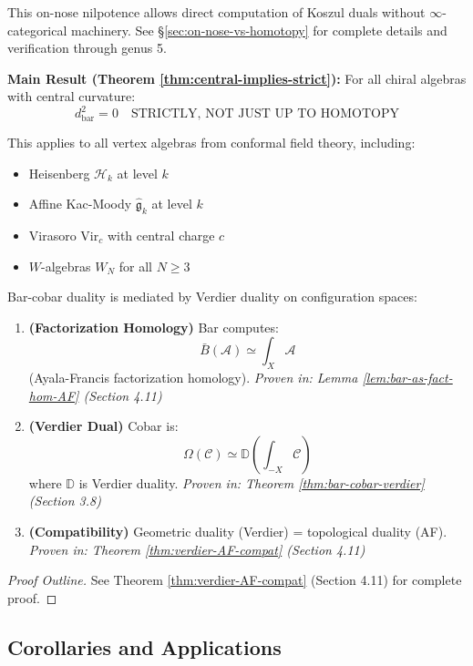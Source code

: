 This on-nose nilpotence allows direct computation of Koszul duals without $\infty$-categorical 
machinery. See \S\ref{sec:on-nose-vs-homotopy} for complete details and verification through genus 5.

\textbf{Main Result (Theorem \ref{thm:central-implies-strict}):} For all chiral algebras with 
central curvature:
$$d_{\text{bar}}^2 = 0 \quad \text{STRICTLY, NOT JUST UP TO HOMOTOPY}$$

This applies to all vertex algebras from conformal field theory, including:
\begin{itemize}
\item Heisenberg $\mathcal{H}_k$ at level $k$
\item Affine Kac-Moody $\widehat{\mathfrak{g}}_k$ at level $k$  
\item Virasoro $\text{Vir}_c$ with central charge $c$
\item $W$-algebras $W_N$ for all $N \geq 3$
\end{itemize}

\begin{maintheorem}\label{mainthm:NAP-complete}
Bar-cobar duality is mediated by Verdier duality on configuration spaces:

\begin{enumerate}
\item \textbf{(Factorization Homology)} Bar computes:
$$\bar{B}(\mathcal{A}) \simeq \int_X \mathcal{A}$$
(Ayala-Francis factorization homology).
\textit{Proven in: Lemma \ref{lem:bar-as-fact-hom-AF} (Section 4.11)}

\item \textbf{(Verdier Dual)} Cobar is:
$$\Omega(\mathcal{C}) \simeq \mathbb{D}\left(\int_{-X} \mathcal{C}\right)$$
where $\mathbb{D}$ is Verdier duality.
\textit{Proven in: Theorem \ref{thm:bar-cobar-verdier} (Section 3.8)}

\item \textbf{(Compatibility)} Geometric duality (Verdier) = topological duality (AF).
\textit{Proven in: Theorem \ref{thm:verdier-AF-compat} (Section 4.11)}
\end{enumerate}
\end{maintheorem}

\begin{proof}[Proof Outline]
See Theorem \ref{thm:verdier-AF-compat} (Section 4.11) for complete proof.
\end{proof}

\subsection{Corollaries and Applications}

